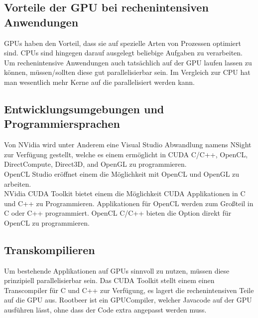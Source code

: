 \subsection{Vorteile der GPU bei rechenintensiven Anwendungen}
\label{sec:Vorteile der GPU bei rechenintensiven Anwendungen}
GPUs haben den Vorteil, dass sie auf spezielle Arten von Prozessen optimiert sind. CPUs sind hingegen darauf ausgelegt beliebige Aufgaben zu verarbeiten. Um rechenintensive Anwendungen auch tatsächlich auf der GPU laufen lassen zu können, müssen/sollten diese gut parallelisierbar sein. 
Im Vergleich zur CPU hat man wesentlich mehr Kerne auf die parallelisiert werden kann.

\subsection{Entwicklungsumgebungen und Programmiersprachen}
Von NVidia wird unter Anderem eine Visual Studio Abwandlung namens NSight zur Verfügung gestellt, welche es einem ermöglicht in CUDA C/C++, OpenCL, DirectCompute, Direct3D, and OpenGL zu programmieren.\\
OpenCL Studio eröffnet einem die Möglichkeit mit OpenCL und OpenGL zu arbeiten.\\
NVidia CUDA Toolkit bietet einem die Möglichkeit CUDA Applikationen in C und C++ zu Programmieren.
Applikationen für OpenCL werden zum Großteil in C oder C++ programmiert. OpenCL C/C++ bieten die Option direkt für OpenCL zu programmieren.

\subsection{Transkompilieren}
Um bestehende Applikationen auf GPUs sinnvoll zu nutzen, müssen diese prinzipiell parallelisierbar sein.
Das CUDA Toolkit stellt einem einen Transcompiler für C und C++ zur Verfügung, es lagert die rechenintensiven Teile auf die GPU aus.
Rootbeer ist ein GPUCompiler, welcher Javacode auf der GPU ausführen lässt, ohne dass der Code extra angepasst werden muss.
